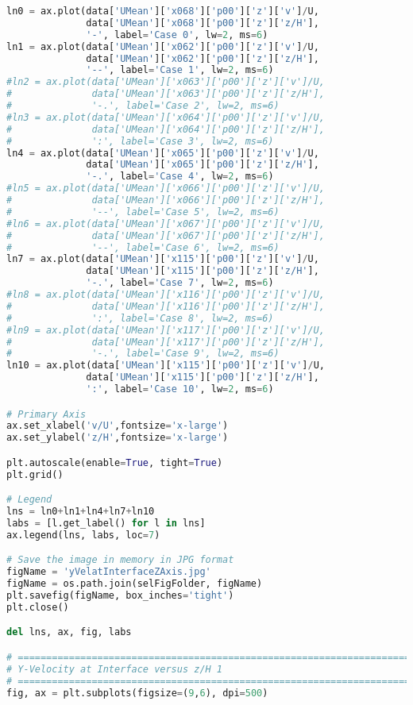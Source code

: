 \begin{lstlisting}[language=python]
ln0 = ax.plot(data['UMean']['x068']['p00']['z']['v']/U,
              data['UMean']['x068']['p00']['z']['z/H'],
              '-', label='Case 0', lw=2, ms=6)
ln1 = ax.plot(data['UMean']['x062']['p00']['z']['v']/U,
              data['UMean']['x062']['p00']['z']['z/H'],
              '--', label='Case 1', lw=2, ms=6)
#ln2 = ax.plot(data['UMean']['x063']['p00']['z']['v']/U,
#              data['UMean']['x063']['p00']['z']['z/H'],
#              '-.', label='Case 2', lw=2, ms=6)
#ln3 = ax.plot(data['UMean']['x064']['p00']['z']['v']/U,
#              data['UMean']['x064']['p00']['z']['z/H'],
#              ':', label='Case 3', lw=2, ms=6)
ln4 = ax.plot(data['UMean']['x065']['p00']['z']['v']/U,
              data['UMean']['x065']['p00']['z']['z/H'],
              '-.', label='Case 4', lw=2, ms=6)
#ln5 = ax.plot(data['UMean']['x066']['p00']['z']['v']/U,
#              data['UMean']['x066']['p00']['z']['z/H'],
#              '--', label='Case 5', lw=2, ms=6)
#ln6 = ax.plot(data['UMean']['x067']['p00']['z']['v']/U,
#              data['UMean']['x067']['p00']['z']['z/H'],
#              '--', label='Case 6', lw=2, ms=6)
ln7 = ax.plot(data['UMean']['x115']['p00']['z']['v']/U,
              data['UMean']['x115']['p00']['z']['z/H'],
              '-.', label='Case 7', lw=2, ms=6)
#ln8 = ax.plot(data['UMean']['x116']['p00']['z']['v']/U,
#              data['UMean']['x116']['p00']['z']['z/H'],
#              ':', label='Case 8', lw=2, ms=6)
#ln9 = ax.plot(data['UMean']['x117']['p00']['z']['v']/U,
#              data['UMean']['x117']['p00']['z']['z/H'],
#              '-.', label='Case 9', lw=2, ms=6)
ln10 = ax.plot(data['UMean']['x115']['p00']['z']['v']/U,
              data['UMean']['x115']['p00']['z']['z/H'],
              ':', label='Case 10', lw=2, ms=6)

# Primary Axis
ax.set_xlabel('v/U',fontsize='x-large')
ax.set_ylabel('z/H',fontsize='x-large')

plt.autoscale(enable=True, tight=True)
plt.grid()

# Legend
lns = ln0+ln1+ln4+ln7+ln10
labs = [l.get_label() for l in lns]
ax.legend(lns, labs, loc=7)

# Save the image in memory in JPG format
figName = 'yVelatInterfaceZAxis.jpg'
figName = os.path.join(selFigFolder, figName)
plt.savefig(figName, box_inches='tight')
plt.close()

del lns, ax, fig, labs

# =============================================================================
# Y-Velocity at Interface versus z/H 1
# =============================================================================
fig, ax = plt.subplots(figsize=(9,6), dpi=500)


\end{lstlisting}
